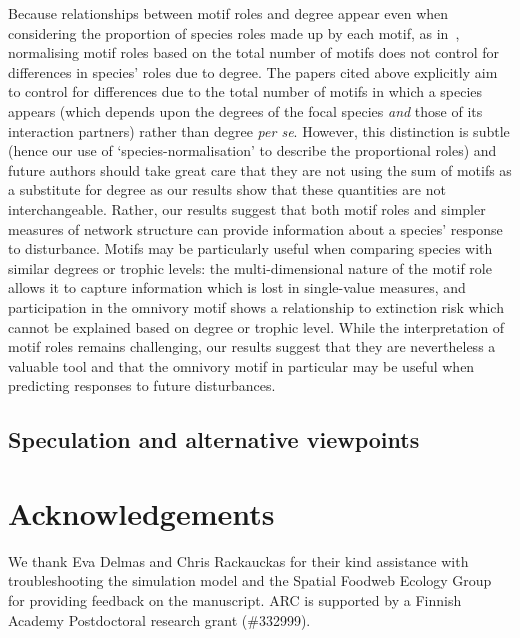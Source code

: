 \documentclass[12pt]{article}
\begin{document}
\begin{spacing}{2.0}
        
	    Because relationships between motif roles and degree appear even when considering the proportion of species roles made up by each motif, as in~\citet{Baker2015,Cirtwill2015,Simmons2019}, normalising motif roles based on the total number of motifs does not control for differences in species' roles due to degree.
	    The papers cited above explicitly aim to control for differences due to the total number of motifs in which a species appears (which depends upon the degrees of the focal species \emph{and} those of its interaction partners) rather than degree \emph{per se}.
	    However, this distinction is subtle (hence our use of `species-normalisation' to describe the proportional roles) and future authors should take great care that they are not using the sum of motifs as a substitute for degree as our results show that these quantities are not interchangeable.
        Rather, our results suggest that both motif roles and simpler measures of network structure can provide information about a species' response to disturbance.
        Motifs may be particularly useful when comparing species with similar degrees or trophic levels: the multi-dimensional nature of the motif role allows it to capture information which is lost in single-value measures, and participation in the omnivory motif shows a relationship to extinction risk which cannot be explained based on degree or trophic level.
        While the interpretation of motif roles remains challenging, our results suggest that they are nevertheless a valuable tool and that the omnivory motif in particular may be useful when predicting responses to future disturbances.
        

    \subsection*{Speculation and alternative viewpoints}


\section*{Acknowledgements}

	We thank Eva Delmas and Chris Rackauckas for their kind assistance with troubleshooting the simulation model and the Spatial Foodweb Ecology Group for providing feedback on the manuscript. ARC is supported by a Finnish Academy Postdoctoral research grant (\#332999). 


\clearpage
     

\clearpage
\end{spacing}
\end{document}
